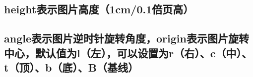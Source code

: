 \documentclass{article}
\begin{document}

\subsection{height表示图片高度（1cm/0.1倍页高）}

\subsection{angle表示图片逆时针旋转角度，origin表示图片旋转中心，默认值为l（左），可以设置为r（右）、c（中）、t（顶）、b（底）、B（基线）}
\end{document}
